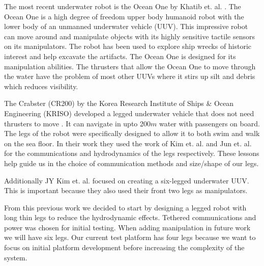 The most recent underwater robot is the Ocean One by Khatib et. al. \cite{oceanone}.
The Ocean One is a high degree of freedom upper body humanoid robot with the lower body of an unmanned underwater vehicle (UUV).
This impressive robot can move around and manipulate objects with its highly sensitive tactile sensors on its manipulators.
The robot has been used to explore ship wrecks of historic interest and help excavate the artifacts.
The Ocean One is designed for its manipulation abilities.
The thrusters that allow the Ocean One to move through the water have the problem of most other UUVs where it stirs up silt and debris which reduces visibility.

The Crabster (CR200) by the Korea Research Institute of Ships \& Ocean Engineering (KRISO) developed a legged underwater vehicle that does not need thrusters to move \cite{seacrab}.
It can navigate in upto 200$m$ water with passengers on board.
The legs of the robot were specifically designed to allow it to both swim and walk on the sea floor.
In their work they used the work of Kim et. al. \cite{crab1} and Jun et. al. for the communications and hydrodynamics of the legs respectively. 
These lessons help guide us in the choice of communication methods and size/shape of our legs.

Additionally JY Kim et. al. \cite{crab3} focused on creating a six-legged underwater UUV.
This is important because they also used their front two legs as manipulators.


From this previous work we decided to start by designing a legged robot with long thin legs to reduce the hydrodynamic effects.
Tethered communications and power was chosen for initial testing.
When adding manipulation in future work we will have six legs.  
Our current test platform has four legs because we want to focus on initial platform development before increasing the complexity of the system.